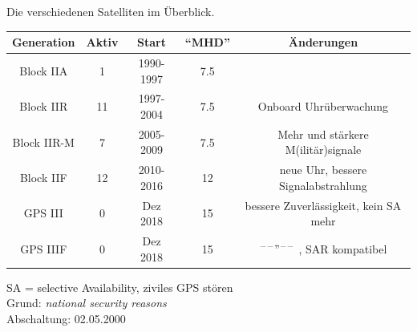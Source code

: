\begin{frame}{Die verschiedenen Satelliten im Überblick.}
    \begin{table}
        \begin{tabular}{c S[table-format=2.0] c S[table-format=2.1] c}
            \toprule
            {Generation} & {Aktiv} & {Start} & {\enquote{MHD}} & {Änderungen} \\
            \midrule
            Block IIA   &  1 & 1990-1997 & 7.5 & \\
            Block IIR   & 11 & 1997-2004 & 7.5 & Onboard Uhrüberwachung \\
            Block IIR-M &  7 & 2005-2009 & 7.5 & Mehr und stärkere M(ilitär)signale \\
            Block IIF   & 12 & 2010-2016 & 12  & neue Uhr, bessere Signalabstrahlung \\
            GPS III     &  0 & Dez 2018  & 15  & bessere Zuverlässigkeit, kein SA mehr \\
            GPS IIIF    &  0 & Dez 2018  & 15  & $^{\---}"^{\---}$ , SAR kompatibel \\
            \bottomrule
        \end{tabular}
    \end{table}
    SA = selective Availability, ziviles GPS stören\\
    Grund: \textit{national security reasons}\\
    Abschaltung: 02.05.2000
\end{frame}

